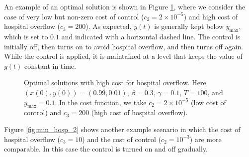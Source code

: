 \documentclass[english,12pt,letter]{article}
\newcommand{\ymax}{y_\text{max}}
\begin{document}
An example of an optimal solution is shown in Figure \ref{fig:min_hosp_1}, where
we consider the case of very low but non-zero cost of control ($c_2=2\times 10^{-5}$) and
high cost of hospital overflow ($c_3=200$).  As expected, $y(t)$ is generally
kept below $\ymax$, which is set to $0.1$ and
indicated with a horizontal dashed line.  The control is initially off, then turns on
to avoid hospital overflow, and then turns off again.  While the control is applied,
it is maintained at a level that keeps the value of $y(t)$ constant in time.

\begin{figure}
    \centering
    \caption{Optimal solutions with high cost for hospital overflow.  Here $(x(0),y(0)) = (0.99,0.01)$, $\beta=0.3$, $\gamma=0.1$, $T=100$,
        and $\ymax=0.1$.
        In the cost function, we take $c_2=2\times 10^{-5}$ (low cost of control) and $c_3=200$ (high cost of hospital overflow).\label{fig:min_hosp_1}}
\end{figure}

Figure \ref{fig:min_hosp_2} shows another example scenario in which the cost of hospital overflow ($c_3=10$)
and the cost of control ($c_2=10^{-3}$) are more comparable.  In this case the control is turned on and off gradually.
\end{document}
